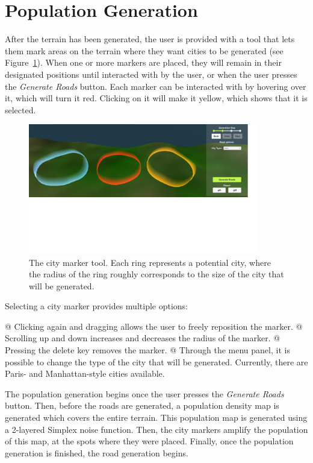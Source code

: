 \section{Population Generation}

After the terrain has been generated, the user is provided with a tool that lets them mark areas on the terrain where they want cities to be generated (see Figure~\ref{fig:citymarkers}).
When one or more markers are placed, they will remain in their designated positions until interacted with by the user, or when the user presses the \textit{Generate Roads} button.
Each marker can be interacted with by hovering over it, which will turn it red.
Clicking on it will make it yellow, which shows that it is selected. 

\begin{figure}[h!]
  \centering

  \includegraphics[width=0.9\textwidth]{figure/citymarkers.png}
  \caption{The city marker tool. Each ring represents a potential city, where the radius of the ring roughly corresponds to the size of the city that will be generated.}

  \label{fig:citymarkers}
\end{figure}

Selecting a city marker provides multiple options:
\begin{easylist}
  @ Clicking again and dragging allows the user to freely reposition the marker.
  @ Scrolling up and down increases and decreases the radius of the marker.
  @ Pressing the delete key removes the marker.
  @ Through the menu panel, it is possible to change the type of the city that will be generated. Currently, there are Paris- and Manhattan-style cities available.
\end{easylist}

The population generation begins once the user presses the \textit{Generate Roads} button.
Then, before the roads are generated, a population density map is generated which covers the entire terrain.
This population map is generated using a 2-layered Simplex noise function.
Then, the city markers amplify the population of this map, at the spots where they were placed.
Finally, once the population generation is finished, the road generation begins.

